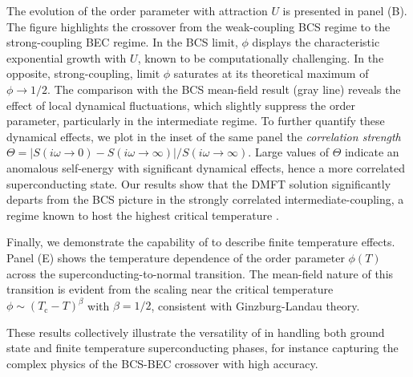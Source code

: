 \documentclass[edipack_sp.tex]{subfiles}
\begin{document}
The evolution of the order parameter with attraction $U$ is presented in panel (B). The figure  
highlights the crossover from the weak-coupling BCS regime to the 
strong-coupling BEC regime. In the BCS limit, $\phi$ displays the 
characteristic exponential growth with $U$, known to be 
computationally challenging. In the opposite, strong-coupling, limit 
$\phi$ saturates at its theoretical maximum of $\phi \rightarrow 1/2$. The comparison with the BCS mean-field result 
(gray line) reveals the effect of local dynamical fluctuations, which  slightly suppress the order parameter, particularly in the intermediate regime. 
To further quantify these dynamical effects, we plot in the inset of the same panel the 
{\it correlation strength} \cite{Amaricci2015PRL,Amaricci2016PRB}
$\Theta=|S(i\omega\to 0)-S(i\omega\to\infty)|/S(i\omega\to\infty)$. 
Large values of $\Theta$ indicate an anomalous self-energy with 
significant dynamical effects, hence a more correlated superconducting state.
Our results show that the DMFT solution significantly departs from the BCS picture in the strongly correlated intermediate-coupling, a regime known to host the highest critical temperature \cite{Toschi2005NJP,Toschi2005PRB}.

Finally, we demonstrate the capability of \NAME to describe finite 
temperature effects. Panel (E) shows the temperature dependence of 
the order parameter $\phi(T)$ across the superconducting-to-normal 
transition. The mean-field nature of this transition is evident from 
the scaling near the critical temperature 
$\phi \sim (T_\mathrm{c} - T)^\beta$ with $\beta = 1/2$, consistent 
with  Ginzburg-Landau theory.

These results collectively illustrate the versatility of \NAME in 
handling both ground state and finite temperature superconducting 
phases, for instance capturing the complex physics of the BCS-BEC crossover with high accuracy.
\end{document}

